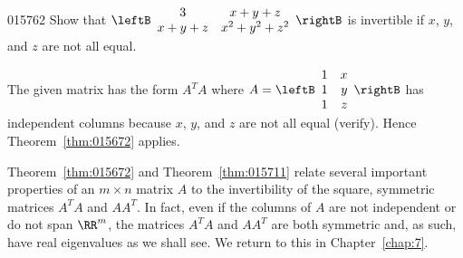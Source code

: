 \begin{example}{}{015762}
Show that $\leftB \begin{array}{cc}
3 & x + y + z \\
x + y + z & x^2 +y^2 + z^2
\end{array} \rightB$ is invertible if $x$, $y$, and $z$ are not all equal.

\begin{solution}
The given matrix has the form $A^{T}A$ where $A =
\leftB \begin{array}{rr}
1 & x\\
1 & y \\
1 & z
\end{array} \rightB$ has independent columns because $x$, $y$, and $z$ are not all equal (verify). Hence Theorem~\ref{thm:015672} applies.
\end{solution}
\end{example}

Theorem~\ref{thm:015672} and Theorem~\ref{thm:015711} relate several important properties of an $m \times n$ matrix $A$ to the invertibility of the square, symmetric matrices $A^{T}A$ and $AA^{T}$. In fact, even if the columns of $A$ are not independent or do not span $\RR^m$, the matrices $A^{T}A$ and $AA^T$ are both symmetric and, as such, have real eigenvalues as we shall see. We return to this in Chapter~\ref{chap:7}.
